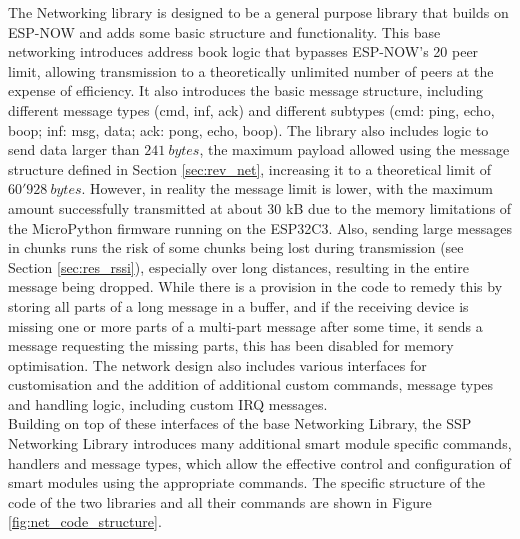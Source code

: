 The Networking library is designed to be a general purpose library that builds on ESP-NOW and adds some basic structure and functionality. This base networking introduces address book logic that bypasses ESP-NOW's 20 peer limit, allowing transmission to a theoretically unlimited number of peers at the expense of efficiency. It also introduces the basic message structure, including different message types (cmd, inf, ack) and different subtypes (cmd: ping, echo, boop; inf: msg, data; ack: pong, echo, boop). The library also includes logic to send data larger than $241\ bytes$, the maximum payload allowed using the message structure defined in Section \ref{sec:rev_net}, increasing it to a theoretical limit of $60'928\ bytes$. However, in reality the message limit is lower, with the maximum amount successfully transmitted at about 30 kB due to the memory limitations of the MicroPython firmware running on the ESP32C3. Also, sending large messages in chunks runs the risk of some chunks being lost during transmission (see Section \ref{sec:res_rssi}), especially over long distances, resulting in the entire message being dropped. While there is a provision in the code to remedy this by storing all parts of a long message in a buffer, and if the receiving device is missing one or more parts of a multi-part message after some time, it sends a message requesting the missing parts, this has been disabled for memory optimisation. 
The network design also includes various interfaces for customisation and the addition of additional custom commands, message types and handling logic, including custom IRQ messages. \\

Building on top of these interfaces of the base Networking Library, the SSP Networking Library introduces many additional smart module specific commands, handlers and message types, which allow the effective control and configuration of smart modules using the appropriate commands. The specific structure of the code of the two libraries and all their commands are shown in Figure \ref{fig:net_code_structure}.


